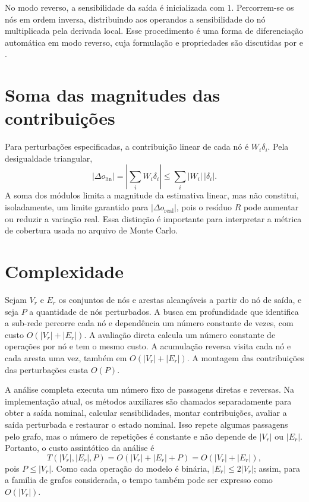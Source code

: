 \documentclass[12pt,openright,oneside,a4paper,brazil]{abntex2}
\begin{document}
No modo reverso, a sensibilidade da saída é inicializada com $1$. Percorrem-se os nós em ordem inversa, distribuindo aos operandos a sensibilidade do nó multiplicada pela derivada local. Esse procedimento é uma forma de diferenciação automática em modo reverso, cuja formulação e propriedades são discutidas por  e .

\section{Soma das magnitudes das contribuições}
Para perturbações especificadas, a contribuição linear de cada nó é $W_i\delta_i$. Pela desigualdade triangular,
\begin{equation}
|\Delta o_{\mathrm{lin}}|=\left|\sum_i W_i\delta_i\right|\leq \sum_i |W_i|\,|\delta_i|.
\label{eq:limite-linear}
\end{equation}
A soma dos módulos limita a magnitude da estimativa linear, mas não constitui, isoladamente, um limite garantido para $|\Delta o_{\mathrm{real}}|$, pois o resíduo $R$ pode aumentar ou reduzir a variação real. Essa distinção é importante para interpretar a métrica de cobertura usada no arquivo de Monte Carlo.

\section{Complexidade}
Sejam $V_r$ e $E_r$ os conjuntos de nós e arestas alcançáveis a partir do nó de saída, e seja $P$ a quantidade de nós perturbados. A busca em profundidade que identifica a sub-rede percorre cada nó e dependência um número constante de vezes, com custo $O(|V_r|+|E_r|)$. A avaliação direta calcula um número constante de operações por nó e tem o mesmo custo. A acumulação reversa visita cada nó e cada aresta uma vez, também em $O(|V_r|+|E_r|)$. A montagem das contribuições das perturbações custa $O(P)$.

A análise completa executa um número fixo de passagens diretas e reversas. Na implementação atual, os métodos auxiliares são chamados separadamente para obter a saída nominal, calcular sensibilidades, montar contribuições, avaliar a saída perturbada e restaurar o estado nominal. Isso repete algumas passagens pelo grafo, mas o número de repetições é constante e não depende de $|V_r|$ ou $|E_r|$. Portanto, o custo assintótico da análise é
\begin{equation}
T(|V_r|,|E_r|,P)=O(|V_r|+|E_r|+P)=O(|V_r|+|E_r|),
\label{eq:custo-total}
\end{equation}
pois $P\leq |V_r|$. Como cada operação do modelo é binária, $|E_r|\leq 2|V_r|$; assim, para a família de grafos considerada, o tempo também pode ser expresso como $O(|V_r|)$.
\end{document}
